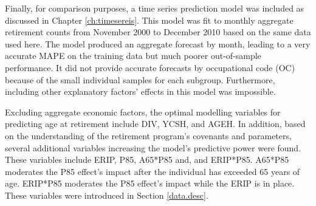 Finally, for comparison purposes, a time series prediction model was included as discussed in Chapter \ref{ch:timesereis}. This model was fit to monthly aggregate retirement counts from November 2000 to December 2010 based on the same data used here. The model produced an aggregate forecast by month, leading to a very accurate MAPE on the training data but much poorer out-of-sample performance. It did not provide accurate forecasts by occupational code (OC) because of the small individual samples for each subgroup. Furthermore, including other explanatory factors' effects in this model was impossible.




Excluding aggregate economic factors, the optimal modelling variables for predicting age at retirement include DIV, YCSH, and AGEH. In addition, based on the understanding of the retirement program's covenants and parameters, several additional variables increasing the model's predictive power were found. These variables include ERIP, P85, A65*P85 and, and ERIP*P85. A65*P85 moderates the P85 effect's impact after the individual has exceeded 65 years of age. ERIP*P85 moderates the P85 effect's impact while the ERIP is in place.  These variables were introduced in Section \ref{data.desc}.

